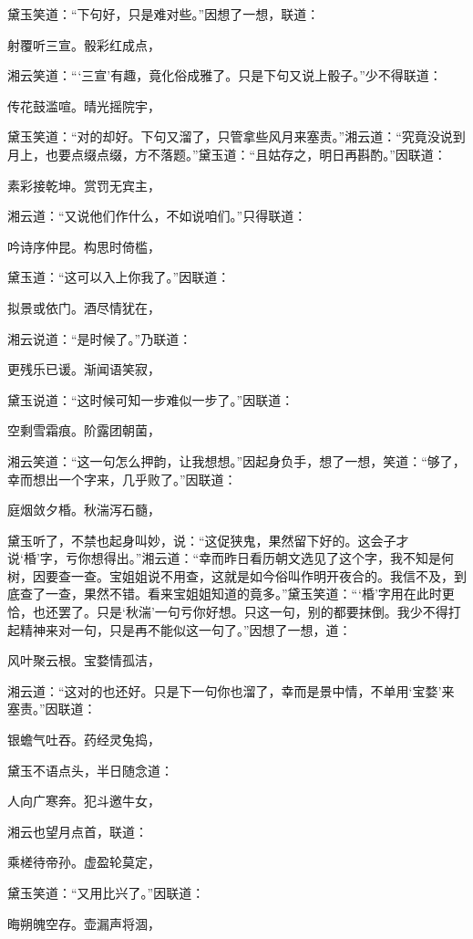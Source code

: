 黛玉笑道：“下句好，只是难对些。”因想了一想，联道：

射覆听三宣。骰彩红成点，

湘云笑道：“‘三宣’有趣，竟化俗成雅了。只是下句又说上骰子。”少不得联道：

传花鼓滥喧。晴光摇院宇，

黛玉笑道：“对的却好。下句又溜了，只管拿些风月来塞责。”湘云道：“究竟没说到月上，也要点缀点缀，方不落题。”黛玉道：“且姑存之，明日再斟酌。”因联道：

素彩接乾坤。赏罚无宾主，

湘云道：“又说他们作什么，不如说咱们。”只得联道：

吟诗序仲昆。构思时倚槛，

黛玉道：“这可以入上你我了。”因联道：

拟景或依门。酒尽情犹在，

湘云说道：“是时候了。”乃联道：

更残乐已谖。渐闻语笑寂，

黛玉说道：“这时候可知一步难似一步了。”因联道：

空剩雪霜痕。阶露团朝菌，

湘云笑道：“这一句怎么押韵，让我想想。”因起身负手，想了一想，笑道：“够了，幸而想出一个字来，几乎败了。”因联道：

庭烟敛夕棔。秋湍泻石髓，

黛玉听了，不禁也起身叫妙，说：“这促狭鬼，果然留下好的。这会子才说‘棔’字，亏你想得出。”湘云道：“幸而昨日看历朝文选见了这个字，我不知是何树，因要查一查。宝姐姐说不用查，这就是如今俗叫作明开夜合的。我信不及，到底查了一查，果然不错。看来宝姐姐知道的竟多。”黛玉笑道：“‘棔’字用在此时更恰，也还罢了。只是‘秋湍’一句亏你好想。只这一句，别的都要抹倒。我少不得打起精神来对一句，只是再不能似这一句了。”因想了一想，道：

风叶聚云根。宝婺情孤洁，

湘云道：“这对的也还好。只是下一句你也溜了，幸而是景中情，不单用‘宝婺’来塞责。”因联道：

银蟾气吐吞。药经灵兔捣，

黛玉不语点头，半日随念道：

人向广寒奔。犯斗邀牛女，

湘云也望月点首，联道：

乘槎待帝孙。虚盈轮莫定，

黛玉笑道：“又用比兴了。”因联道：

晦朔魄空存。壶漏声将涸，


